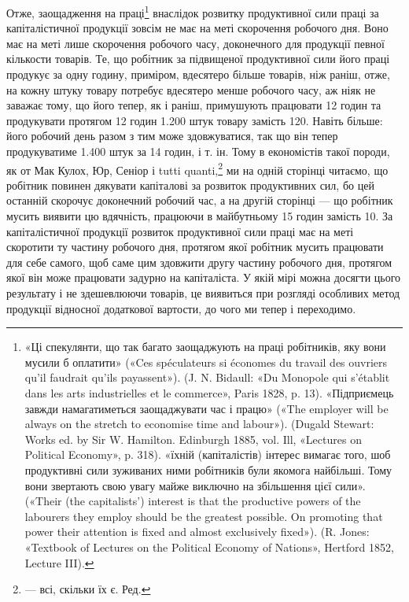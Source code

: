 Отже, заощадження на праці\footnote{
«Ці спекулянти, що так багато заощаджують на праці робітників,
яку вони мусили б оплатити» («Ces spéculateurs si économes du travail
des ouvriers qu’il faudrait qu’ils payassent»). (J. N. Bidaull: «Du
Monopole qui s’établit dans les arts industrielles et le commerce», Paris
1828, p. 13). «Підприємець завжди намагатиметься заощаджувати час і
працю» («The employer will be always on the stretch to economise
time and labour»). (Dugald Stewart: Works ed. by Sir W. Hamilton.
Edinburgh 1885, vol. Ill, «Lectures on Political Economy», p. 318). «їхній (капіталістів) інтерес
вимагає того, шоб продуктивні сили зуживаних
ними робітників були якомога найбільші. Тому вони звертають свою
увагу майже виключно на збільшення цієї сили». («Their (the capitalists’)
interest is that the productive powers of the labourers they employ should
be the greatest possible. On promoting that power their attention is fixed
and almost exclusively fixed»). (R. Jones: «Textbook of Lectures on
the Political Economy of Nations», Hertford 1852, Lecture III).
} внаслідок розвитку продуктивної сили праці за капіталістичної продукції
зовсім не має на меті
скорочення робочого дня. Воно має на меті лише скорочення робочого часу, доконечного для продукції
певної кількости товарів.
Те, що робітник за підвищеної продуктивної сили його праці
продукує за одну годину, приміром, вдесятеро більше товарів,
ніж раніш, отже, на кожну штуку товару потребує вдесятеро
менше робочого часу, аж ніяк не заважає тому, що його тепер,
як і раніш, примушують працювати 12 годин та продукувати
протягом 12 годин 1.200 штук товару замість 120. Навіть більше:
його робочий день разом з тим може здовжуватися, так що він
тепер продукуватиме 1.400 штук за 14 годин, і т. ін. Тому в економістів
такої породи, як от Мак Кулох, Юр, Сеніор і tutti
quanti,\footnote*{
— всі, скільки їх є. Ред.
} ми на одній сторінці читаємо, що робітник повинен дякувати капіталові за розвиток
продуктивних сил, бо цей останній
скорочує доконечний робочий час, а на другій сторінці — що
робітник мусить виявити цю вдячність, працюючи в майбутньому
15 годин замість 10. За капіталістичної продукції розвиток продуктивної сили праці має на меті
скоротити ту частину робочого
дня, протягом якої робітник мусить працювати для себе самого,
щоб саме цим здовжити другу частину робочого дня, протягом
якої він може працювати задурно на капіталіста. У якій мірі
можна досягти цього результату і не здешевлюючи товарів, це
виявиться при розгляді особливих метод продукції відносної
додаткової вартости, до чого ми тепер і переходимо.
